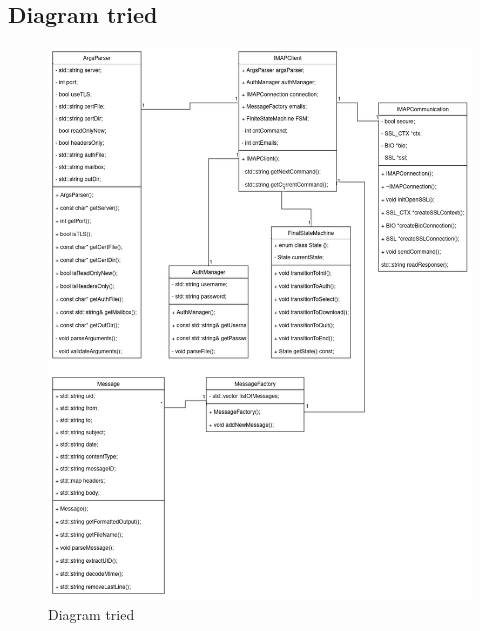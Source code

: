 \documentclass[a4paper, 11pt]{article}
\begin{document}
	\subsection{Diagram tried}
	\label{subsection:class}
	\begin{figure}[!ht]
		\centering
		\vspace{1cm}
		\includegraphics[width=0.9\linewidth]{res/diagram_class.png}
		\caption{Diagram tried}
		\label{figure:class}
	\end{figure}

	\clearpage
\end{document}
